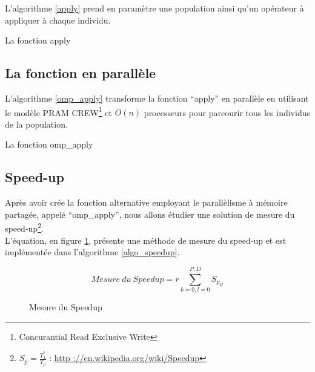 L'algorithme \ref{apply} prend en paramètre une population ainsi qu'un opérateur à appliquer à chaque individu.

\incmargin{1em}
\begin{algorithm}[here]
  \dontprintsemicolon
  \caption{La fonction apply}
  \label{apply}
\end{algorithm}
\decmargin{1em}

\subsection{La fonction en parallèle}

L'algorithme \ref{omp_apply} transforme la fonction ``apply'' en parallèle en utilisant le modèle PRAM CREW\footnote{Concurantial Read Exclusive Write} et $O(n)$ processeurs pour parcourir tous les individus de la population.

\incmargin{1em}
\begin{algorithm}[here]
  \dontprintsemicolon
  \caption{La fonction omp\_apply}
  \label{omp_apply}
\end{algorithm}
\decmargin{1em}

\subsection{Speed-up}

Après avoir crée la fonction alternative employant le parallèlisme à mémoire partagée, appelé ``omp\_apply'', nous allons étudier une solution de mesure du speed-up\footnote{$S_p = \frac{T_1^*}{T_p}$ : \url{http ://en.wikipedia.org/wiki/Speedup}}.\\

L'équation, en figure \ref{fig:mesure_speedup}, présente une méthode de mesure du speed-up et est implémentée dans l'algorithme \ref{algo_speedup}.

\begin{figure}[here]
\centering
$$Mesure\ du\ Speedup = r \sum^{P,D}_{k=0,l=0} S_{p_{kl}}$$
\caption{Mesure du Speedup}
\label{fig:mesure_speedup}
\end{figure}

